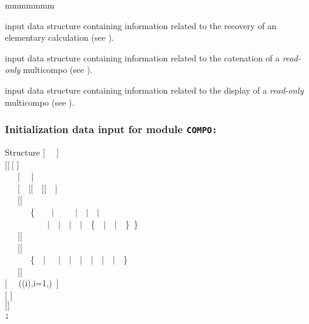 \begin{ListeDeDescription}{mmmmmmm}
\item[\dusa{compo\_data2}] input data structure containing information related to the recovery of an
elementary calculation (see ).

\item[\dusa{compo\_data3}] input data structure containing information related to the catenation of a
{\sl read-only} {\sc multicompo} (see ).

\item[\dusa{compo\_data4}] input data structure containing information related to the display of a
{\sl read-only} {\sc multicompo} (see ).

\end{ListeDeDescription}

\subsubsection{Initialization data input for module {\tt COMPO:}}\label{sect:desccpo1}

\vskip -0.5cm

\begin{DataStructure}{Structure }
$[$~ ~$]$ \\
$[[~[$    $]$ \\
~~~$[$~ ~$]$ \\
~~~$[$~~$[[$~~$]]$~~$]$ \\
~~~$[[$~~ \\
~~~~~~\{~~~~$|$~~~~~$|$~~$|$~~$|$ \\
~~~~~~~~~~$|$~~$|$~~$|$~~$|$~~\{~~$|$~~$|$~~\}~\} \\
~~~$]]$ \\
~~~$[[$~~ \\
~~~~~~\{~~$|$~~~$|$~~$|$~~$|$~~$|$~~$|$~~$|$~~\} \\
~~~$]]$ \\
$[$~~ ((i),i=1,)~$]$ \\
$[$  $]$ \\
 $]]$ \\
{\tt ;}
\end{DataStructure}

